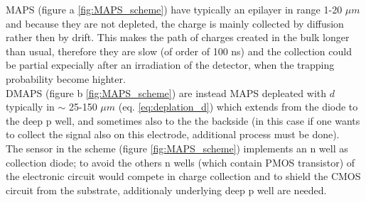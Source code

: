 MAPS (figure a \ref{fig:MAPS_scheme}) have typically an epilayer in range 1-20 $\mu m$ and because they are not depleted, the charge is mainly collected by diffusion rather then by drift. This makes the path of charges created in the bulk longer than usual, therefore they are slow (of order of 100 ns) and the collection could be partial expecially after an irradiation of the detector, when the trapping probability become highter. \\
DMAPS (figure b \ref{fig:MAPS_scheme}) are instead MAPS depleated with $d$ typically in $\sim$ 25-150 $\mu m$ (eq. \ref{eq:deplation_d}) which extends from the diode to the deep p well, and sometimes also to the the backside (in this case if one wants to collect the signal also on this electrode, additional process must be done).\\
The sensor in the scheme  (figure \ref{fig:MAPS_scheme}) implements an n well as  collection diode; to avoid the others n wells (which contain PMOS transistor) of the electronic circuit would compete in charge collection and to shield the CMOS circuit from the substrate, additionaly underlying deep p well are needed.

